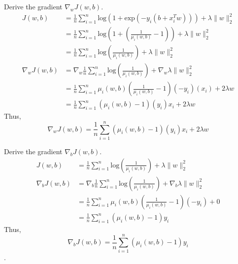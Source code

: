 Derive the gradient $\nabla_w J(w,b)$.
\begin{align*}
    J(w, b) &= \frac{1}{n} \sum_{i=1}^n \textrm{log} \left( 1 + \textrm{exp} \left( -y_i \left( b + x_i^T w \right) \right) \right) + \lambda \| w \|_2^2 \\
        &= \frac{1}{n} \sum_{i=1}^n \textrm{log} \left( 1 + \left( \frac{1}{\mu_i (w, b)} - 1 \right) \right) + \lambda \| w \|_2^2 \\ 
        &= \frac{1}{n} \sum_{i=1}^n \textrm{log} \left( \frac{1}{\mu_i (w, b)} \right) + \lambda \| w \|_2^2 \\
    \nabla_w J(w, b) &= \nabla_w \frac{1}{n} \sum_{i=1}^n \textrm{log} \left( \frac{1}{\mu_i (w, b)} \right) + \nabla_w \lambda \| w \|_2^2 \\ 
        &= \frac{1}{n} \sum_{i=1}^n \mu_i(w, b) \left( \frac{1}{\mu_i(w, b)} - 1 \right)(-y_i)(x_i) + 2 \lambda w \\
        &= \frac{1}{n} \sum_{i=1}^n \left( \mu_i(w, b) - 1 \right)(y_i)x_i + 2 \lambda w
\end{align*}
Thus, $$ \boxed{ \nabla_w J(w,b) = \frac{1}{n} \sum_{i=1}^n \left( \mu_i(w, b) - 1 \right)(y_i)x_i + 2 \lambda w } $$

Derive the gradient $\nabla_b J(w, b)$.
\begin{align*}
        J(w, b) &= \frac{1}{n} \sum_{i=1}^n \textrm{log} \left( \frac{1}{\mu_i (w, b)} \right) + \lambda \| w \|_2^2 \\
        \nabla_b J(w, b) &= \nabla_b \frac{1}{n} \sum_{i=1}^n \textrm{log} \left( \frac{1}{\mu_i (w, b)} \right) + \nabla_b \lambda \| w \|_2^2 \\ 
            &= \frac{1}{n} \sum_{i=1}^n \mu_i(w, b) \left( \frac{1}{\mu_i(w, b)} - 1 \right) (- y_i) + 0 \\
            &= \frac{1}{n} \sum_{i=1}^n \left( \mu_i(w, b) - 1 \right) y_i
\end{align*}   
Thus, $$ \boxed{ \nabla_b J(w, b) = \frac{1}{n} \sum_{i=1}^n \left( \mu_i(w, b) - 1 \right) y_i } $$.
